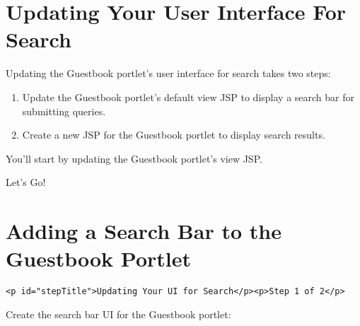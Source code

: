 \chapter{Updating Your User Interface For
Search}\label{updating-your-user-interface-for-search}

Updating the Guestbook portlet's user interface for search takes two
steps:

\begin{enumerate}
\def\labelenumi{\arabic{enumi}.}
\item
  Update the Guestbook portlet's default view JSP to display a search
  bar for submitting queries.
\item
  Create a new JSP for the Guestbook portlet to display search results.
\end{enumerate}

You'll start by updating the Guestbook portlet's view JSP.

Let's Go!{}

\chapter{Adding a Search Bar to the Guestbook
Portlet}\label{adding-a-search-bar-to-the-guestbook-portlet}

\begin{verbatim}
<p id="stepTitle">Updating Your UI for Search</p><p>Step 1 of 2</p>
\end{verbatim}

Create the search bar UI for the Guestbook portlet:

